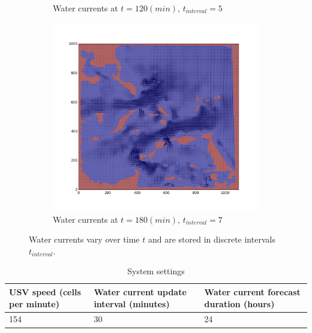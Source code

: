 \documentclass{tamuccthesis}
\begin{document}
\begin{figure}[H]
\begin{subfigure}[b]{0.475\textwidth}
        \caption{{\small Water currents at $t = 120 (min)$, $t_{interval} = 5$}}   
        \label{fig:currents_interval_5}
    \end{subfigure}
    \quad
    \begin{subfigure}[b]{0.475\textwidth}   
        \centering 
        \includegraphics[width=\textwidth,trim={3cm 3cm 3cm 3cm},clip]{Fig_currentsMap-7.png}
        \caption[interval 7]%
        {{\small Water currents at $t = 180 (min)$, $t_{interval} = 7$}}   
        \label{fig:currents_interval_7}
    \end{subfigure}
    \caption[Dynamic water currents.]{Water currents vary over time $t$ and are stored in discrete intervals $t_{interval}$.} 
    \label{fig:currents_intervals}
\end{figure}

\begin{table}[H]\small
    \begin{tabular}{|l|l|l|}
    \hline
    USV speed (cells per minute) & Water current update interval (minutes) & Water current forecast duration (hours) \\
    \hline
    154                 & 30                                      & 24 \\
    \hline
    \end{tabular}
    \caption{System settings}
    \label{sys_settings}
\end{table}
\end{document}
